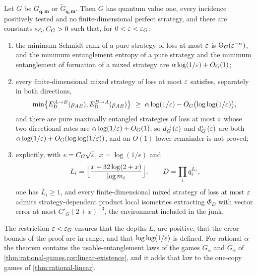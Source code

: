 \begin{theorem}\label{thm:rational-ED}
Let $G$ be $G_{\mathbf q,\mathbf m}$ or $\widetilde G_{\mathbf q,\mathbf m}$. Then $G$ has quantum value one, every incidence positively tested
and no finite-dimensional perfect strategy, and there are constants $\varepsilon_G,C_G>0$ such that, for $0<\varepsilon<\varepsilon_G$:
\begin{enumerate}[label=(\alph*),itemsep=1pt]
\item the minimum Schmidt rank of a pure strategy of loss at most $\varepsilon$ is $\Theta_G(\varepsilon^{-\alpha})$, and the minimum entanglement
entropy of a pure strategy and the minimum entanglement of formation of a mixed strategy are $\alpha\log(1/\varepsilon)+O_G(1)$;
\item every finite-dimensional mixed strategy of loss at most $\varepsilon$ satisfies, separately in both directions,
\[
\min\bigl\{\ED^{A\to B}(\rho_{AB}),\ED^{B\to A}(\rho_{AB})\bigr\}\ \ge\ \alpha\log(1/\eps)-O_G\bigl(\log\log(1/\eps)\bigr),
\]
and there are pure maximally entangled strategies of loss at most $\varepsilon$ whose two directional rates are $\alpha\log(1/\varepsilon)+O_G(1)$;
so $d^\to_G(\varepsilon)$ and $d^\leftarrow_G(\varepsilon)$ are both $\alpha\log(1/\varepsilon)+O_G(\log\log(1/\varepsilon))$, and an $O(1)$ lower remainder is not
proved;
\item explicitly, with $e=C_G\sqrt{\varepsilon}$, $x=\log(1/e)$ and
\[
L_i=\Bigl\lfloor\frac{x-32\log(2+x)}{\log m_i}\Bigr\rfloor,\qquad D=\prod_iq_i^{L_i},
\]
one has $L_i\ge1$, and every finite-dimensional mixed strategy of loss at most $\varepsilon$ admits strategy-dependent product local
isometries extracting $\Phi_D$ with vector error at most $C'_G(2+x)^{-3}$, the environment included in the junk.
\end{enumerate}
\end{theorem}

The restriction $\varepsilon<\varepsilon_G$ ensures that the depths $L_i$ are positive, that the error bounds of the proof are in range, and that
$\log\log(1/\varepsilon)$ is defined. For rational $\alpha$ the theorem contains the usable-entanglement laws of the games $G_\alpha$ and
$\widetilde G_\alpha$ of \cref{thm:rational-games,cor:linear-existence}, and it adds that law to the one-copy games of
\cref{thm:rational-linear}.

